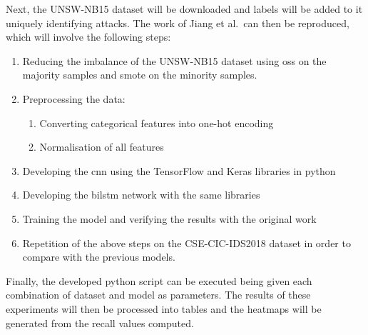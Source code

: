 Next, the UNSW-NB15 dataset will be downloaded and labels will be added to it
uniquely identifying attacks. The work of Jiang et al.\ can then be reproduced,
which will involve the following steps:
\begin{enumerate}
      \item Reducing the imbalance of the UNSW-NB15 dataset using \gls{oss} on the majority
            samples and \gls{smote} on the minority samples.
      \item Preprocessing the data:
            \begin{enumerate}
                  \item Converting categorical features into one-hot encoding
                  \item Normalisation of all features
            \end{enumerate}
      \item Developing the \gls{cnn} using the TensorFlow and Keras libraries in python
      \item Developing the \gls{bilstm} network with the same libraries
      \item Training the model and verifying the results with the original work
      \item Repetition of the above steps on the CSE-CIC-IDS2018 dataset in order to compare
            with the previous models.
\end{enumerate}

Finally, the developed python script can be executed being given each
combination of dataset and model as parameters. The results of these
experiments will then be processed into tables and the heatmaps will be
generated from the recall values computed.
